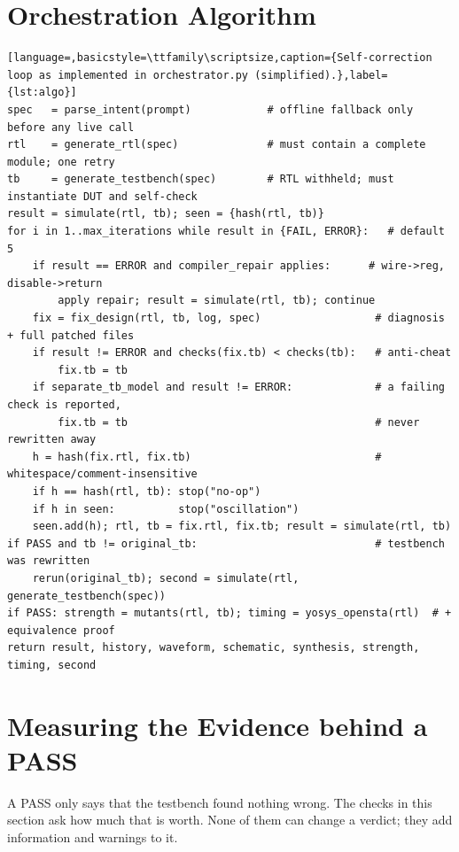 \section{Orchestration Algorithm}
\begin{lstlisting}[language=,basicstyle=\ttfamily\scriptsize,caption={Self-correction loop as implemented in orchestrator.py (simplified).},label={lst:algo}]
spec   = parse_intent(prompt)            # offline fallback only before any live call
rtl    = generate_rtl(spec)              # must contain a complete module; one retry
tb     = generate_testbench(spec)        # RTL withheld; must instantiate DUT and self-check
result = simulate(rtl, tb); seen = {hash(rtl, tb)}
for i in 1..max_iterations while result in {FAIL, ERROR}:   # default 5
    if result == ERROR and compiler_repair applies:      # wire->reg, disable->return
        apply repair; result = simulate(rtl, tb); continue
    fix = fix_design(rtl, tb, log, spec)                  # diagnosis + full patched files
    if result != ERROR and checks(fix.tb) < checks(tb):   # anti-cheat
        fix.tb = tb
    if separate_tb_model and result != ERROR:             # a failing check is reported,
        fix.tb = tb                                       # never rewritten away
    h = hash(fix.rtl, fix.tb)                             # whitespace/comment-insensitive
    if h == hash(rtl, tb): stop("no-op")
    if h in seen:          stop("oscillation")
    seen.add(h); rtl, tb = fix.rtl, fix.tb; result = simulate(rtl, tb)
if PASS and tb != original_tb:                            # testbench was rewritten
    rerun(original_tb); second = simulate(rtl, generate_testbench(spec))
if PASS: strength = mutants(rtl, tb); timing = yosys_opensta(rtl)  # + equivalence proof
return result, history, waveform, schematic, synthesis, strength, timing, second
\end{lstlisting}

\section{Measuring the Evidence behind a PASS}
\label{sec:evidence}
A PASS only says that the testbench found nothing wrong. The checks in this section
ask how much that is worth. None of them can change a verdict; they add
information and warnings to it.


